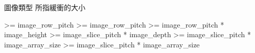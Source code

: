 \bTABLE[option=stretch]

\bTABLEhead
  \bTR[background=color,backgroundcolor=gray]
    \bTH 圖像類型 \eTH
    \bTH {} 所指緩衝的大小 \eTH
  \eTR
\eTABLEhead

\bTABLEbody
  \bTR
    \bTD {} \eTD
    \bTD >= image_row_pitch \eTD
  \eTR
  \bTR
    \bTD {} \eTD
    \bTD >= image_row_pitch \eTD
  \eTR
  \bTR
    \bTD {} \eTD
    \bTD >= image_row_pitch * image_height \eTD
  \eTR
  \bTR
    \bTD {} \eTD
    \bTD >= image_slice_pitch * image_depth \eTD
  \eTR
  \bTR
    \bTD {} \eTD
    \bTD >= image_slice_pitch * image_array_size \eTD
  \eTR
  \bTR
    \bTD {} \eTD
    \bTD >= image_slice_pitch * image_array_size \eTD
  \eTR
\eTABLEbody

\eTABLE
